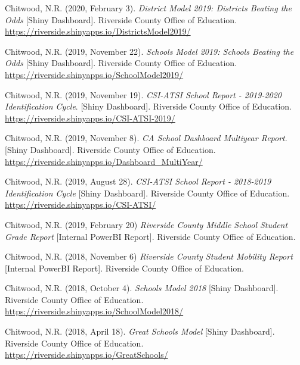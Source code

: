       \begin{pubitems} %
        \item {Chitwood, N.R. (2020, February 3). \textit{District Model 2019: Districts Beating the Odds} [Shiny Dashboard]. Riverside County Office of Education. \url{https://riverside.shinyapps.io/DistrictsModel2019/}}
        \item {Chitwood, N.R. (2019, November 22). \textit{Schools Model 2019: Schools Beating the Odds} [Shiny Dashboard]. Riverside County Office of Education. \url{https://riverside.shinyapps.io/SchoolModel2019/}}
        \item {Chitwood, N.R. (2019, November 19). \textit{CSI-ATSI School Report - 2019-2020 Identification Cycle}. [Shiny Dashboard]. Riverside County Office of Education. \url{https://riverside.shinyapps.io/CSI-ATSI-2019/}}
        \item {Chitwood, N.R. (2019, November 8). \textit{CA School Dashboard Multiyear Report}. [Shiny Dashboard]. Riverside County Office of Education. \url{https://riverside.shinyapps.io/Dashboard\_MultiYear/}}
        \item {Chitwood, N.R. (2019, August 28). \textit{CSI-ATSI School Report - 2018-2019 Identification Cycle} [Shiny Dashboard]. Riverside County Office of Education. \url{https://riverside.shinyapps.io/CSI-ATSI/}}
        \item {Chitwood, N.R. (2019, February 20) \textit{Riverside County Middle School Student Grade Report} [Internal PowerBI Report]. Riverside County Office of Education.}
        \item {Chitwood, N.R. (2018, November 6) \textit{Riverside County Student Mobility Report} [Internal PowerBI Report]. Riverside County Office of Education.}
        \item {Chitwood, N.R. (2018, October 4). \textit{Schools Model 2018} [Shiny Dashboard]. Riverside County Office of Education. \url{https://riverside.shinyapps.io/SchoolModel2018/}}
        \item {Chitwood, N.R. (2018, April 18). \textit{Great Schools Model} [Shiny Dashboard]. Riverside County Office of Education. \url{https://riverside.shinyapps.io/GreatSchools/}}
      \end{pubitems}
